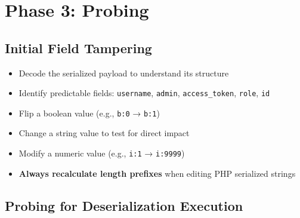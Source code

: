 \documentclass[11pt]{article}
\begin{document}
\section{Phase 3: Probing}

\subsection{Initial Field Tampering}

\begin{checklistbox}
\begin{itemize}
    \item[\checkmark] Decode the serialized payload to understand its structure
    \item[\checkmark] Identify predictable fields: \texttt{username}, \texttt{admin}, \texttt{access\_token}, \texttt{role}, \texttt{id}
    \item[\checkmark] Flip a boolean value (e.g., \texttt{b:0} → \texttt{b:1})
    \item[\checkmark] Change a string value to test for direct impact
    \item[\checkmark] Modify a numeric value (e.g., \texttt{i:1} → \texttt{i:9999})
    \item[\checkmark] \textbf{Always recalculate length prefixes} when editing PHP serialized strings
\end{itemize}
\end{checklistbox}

\subsection{Probing for Deserialization Execution}
\end{document}
